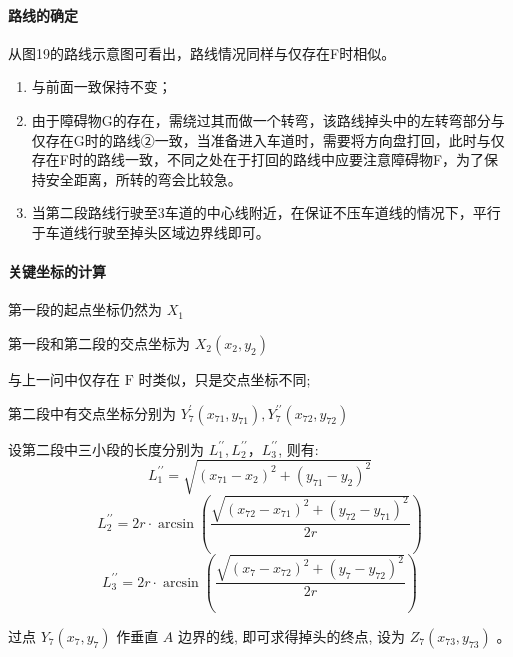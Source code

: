 \documentclass{article}
\begin{document}
\paragraph{路线的确定}
从图19的路线示意图可看出，路线情况同样与仅存在F时相似。
\begin{enumerate}[\indent 第1段：]
    \item 与前面一致保持不变；
    \item 由于障碍物G的存在，需绕过其而做一个转弯，该路线掉头中的左转弯部分与仅存在G时的路线②一致，当准备进入车道时，需要将方向盘打回，此时与仅存在F时的路线一致，不同之处在于打回的路线中应要注意障碍物F，为了保持安全距离，所转的弯会比较急。
    \item 当第二段路线行驶至3车道的中心线附近，在保证不压车道线的情况下，平行于车道线行驶至掉头区域边界线即可。
\end{enumerate}

\paragraph{关键坐标的计算}
\noindent 第一段的起点坐标仍然为 $X_{1}$

\noindent 第一段和第二段的交点坐标为 $X_{2}\left(x_{2}, y_{2}\right)$

\noindent 与上一问中仅存在 $\mathrm{F}$ 时类似，只是交点坐标不同;

\noindent 第二段中有交点坐标分别为 $Y_{7}^{\prime}\left(x_{71}, y_{71}\right), Y_{7}^{\prime \prime}\left(x_{72}, y_{72}\right)$

\noindent 设第二段中三小段的长度分别为 $L_{1}^{\prime \prime}, L_{2}^{\prime \prime} ，L_{3}^{\prime \prime}$, 则有:
\begin{equation}
    L_{1}^{\prime \prime}=\sqrt{\left(x_{71}-x_{2}\right)^{2}+\left(y_{71}-y_{2}\right)^{2}}
\end{equation}
\begin{equation}
    L_{2}^{\prime \prime}=2 r \cdot \arcsin \left(\frac{\sqrt{\left(x_{72}-x_{71}\right)^{2}+\left(y_{72}-y_{71}\right)^{2}}}{2 r}\right)
\end{equation}
\begin{equation}
    L_{3}^{\prime \prime}=2 r \cdot \arcsin \left(\frac{\sqrt{\left(x_{7}-x_{72}\right)^{2}+\left(y_{7}-y_{72}\right)^{2}}}{2 r}\right)
\end{equation}

\noindent 过点 $Y_{7}\left(x_{7}, y_{7}\right)$ 作垂直 $A$ 边界的线, 即可求得掉头的终点, 设为 $Z_{7}\left(x_{73}, y_{73}\right)$ 。
\end{document}
